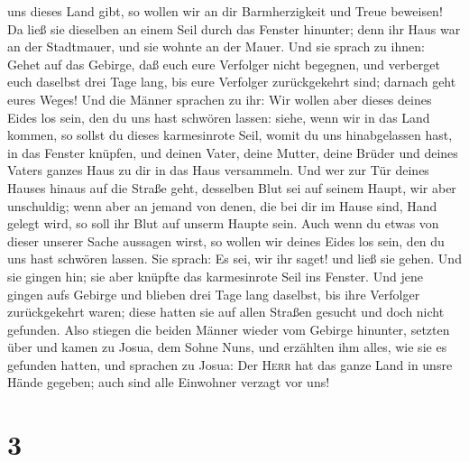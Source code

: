 uns dieses Land gibt, so wollen wir an dir Barmherzigkeit und Treue
beweisen!  Da ließ sie dieselben an einem Seil durch das
Fenster hinunter; denn ihr Haus war an der Stadtmauer, und sie wohnte an
der Mauer.  Und sie sprach zu ihnen: Gehet auf das
Gebirge, daß euch eure Verfolger nicht begegnen, und verberget euch
daselbst drei Tage lang, bis eure Verfolger zurückgekehrt sind; darnach
geht eures Weges!  Und die Männer sprachen zu ihr: Wir
wollen aber dieses deines Eides los sein, den du uns hast schwören
lassen:  siehe, wenn wir in das Land kommen, so sollst du
dieses karmesinrote Seil, womit du uns hinabgelassen hast, in das
Fenster knüpfen, und deinen Vater, deine Mutter, deine Brüder und deines
Vaters ganzes Haus zu dir in das Haus versammeln.  Und
wer zur Tür deines Hauses hinaus auf die Straße geht, desselben Blut sei
auf seinem Haupt, wir aber unschuldig; wenn aber an jemand von denen,
die bei dir im Hause sind, Hand gelegt wird, so soll ihr Blut auf unserm
Haupte sein.  Auch wenn du etwas von dieser unserer Sache
aussagen wirst, so wollen wir deines Eides los sein, den du uns hast
schwören lassen.  Sie sprach: Es sei, wir ihr saget! und
ließ sie gehen. Und sie gingen hin; sie aber knüpfte das karmesinrote
Seil ins Fenster.  Und jene gingen aufs Gebirge und
blieben drei Tage lang daselbst, bis ihre Verfolger zurückgekehrt waren;
diese hatten sie auf allen Straßen gesucht und doch nicht gefunden.
 Also stiegen die beiden Männer wieder vom Gebirge
hinunter, setzten über und kamen zu Josua, dem Sohne Nuns, und erzählten
ihm alles, wie sie es gefunden hatten,  und sprachen zu
Josua: Der \textsc{Herr} hat das ganze Land in unsre Hände gegeben; auch
sind alle Einwohner verzagt vor uns!

\hypertarget{section-2}{%
\section{3}\label{section-2}}

